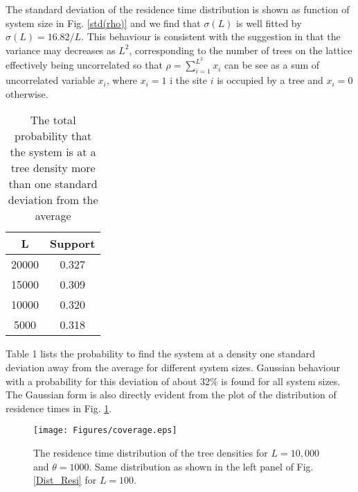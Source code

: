 \documentclass[aps,prl,showpacs,superscriptaddress,groupedaddress,notitlepage]{revtex4-1}
\begin{document}
The standard deviation of the residence time distribution is shown as function of system size in Fig. \ref{std(rho)} and we find that $\sigma(L)$ is well fitted by $\sigma(L)= 16.82/L$. This behaviour is consistent with the suggestion in \cite{Pruessner2002} that the variance may decreases as $L^2$, corresponding to the number of trees on the lattice effectively being uncorrelated so that $\rho=\sum_{i=1}^{L^2}x_i$ can be see as a sum of uncorrelated variable $x_i$, where $x_i=1$ i the site $i$ is occupied by a tree and $x_i=0$ otherwise.




\begin{table}[]
\centering
\caption{The total probability that the system is at a tree density more than one standard deviation from the average}
\label{my-label}
\begin{tabular}{|c|c|}
\hline
\rowcolor[HTML]{BBDAFF}
\textbf{L} & \textbf{Support} \\ \hline
\rowcolor[HTML]{ECF4FF}
20000      & 0.327            \\ \hline
\rowcolor[HTML]{ECF4FF}
15000      & 0.309            \\ \hline
\rowcolor[HTML]{ECF4FF}
10000      & 0.320            \\ \hline
\rowcolor[HTML]{ECF4FF}
5000       & 0.318            \\ \hline
\end{tabular}
\label{Table1}
\end{table}


Table 1 lists the probability to find the system at a density one standard deviation away from the average for different system sizes. Gaussian behaviour with a probability for this deviation of about 32\% is found for all system sizes. The Gaussian form is also directly evident from the plot of the distribution of residence times in Fig. \ref{Large_resi}.
\begin{figure}[!h]
\centering
\texttt{[image: Figures/coverage.eps]}\\
  \caption{The residence time distribution of the tree densities for $L=10,000$ and $\theta=1000$. Same distribution as shown in the left panel of Fig. \ref{Dist_Resi} for $L=100$.}
\label{Large_resi}
\end{figure}
\end{document}
